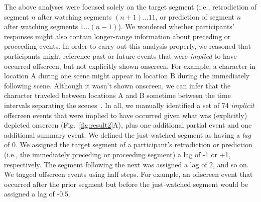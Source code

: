 \documentclass[10pt]{article}
\begin{document}
The above analyses were focused solely on the target segment (i.e.,
retrodiction of segment $n$ after watching segments $(n+1)... 11$, or
prediction of segment $n$ after watching segments $1 ...(n-1)$). We wondered
whether participants' responses might also contain longer-range information
about preceding or proceeding events. In order to carry out this analysis
properly, we reasoned that participants might reference past or future events
that were \textit{implied} to have occurred offscreen, but not explicitly shown
onscreen. For example, a character in location A during one scene might appear
in location B during the immediately following scene. Although it wasn't shown
onscreen, we can infer that the character traveled between locations A and B
sometime between the time intervals separating the scenes~\citep{Bord08}. In
all, we manually identified a set of 74 \textit{implicit} offscreen events that
were implied to have occurred given what was (explicitly) depicted onscreen
(Fig.~\ref{fig:result2}A), plus one additional partial event and one additional
summary event. We defined the just-watched segment as having a \textit{lag} of
0. We assigned the target segment of a participant's retrodiction or prediction
(i.e., the immediately preceding or proceeding segment) a lag of -1 or +1,
respectively. The segment following the next was assigned a lag of 2, and so
on. We tagged offscreen events using half steps. For example, an offscreen
event that occurred after the prior segment but before the just-watched segment
would be assigned a lag of -0.5.
\end{document}
